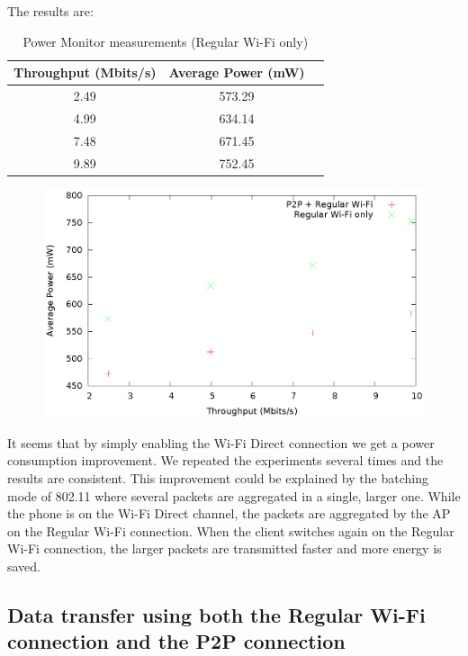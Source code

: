 The results are:

\begin{table}[h!]
  \centering
  \caption{Power Monitor measurements (Regular Wi-Fi only)}
  \label{tab:table1}
  \begin{tabular}{ccc}
    \toprule
    Throughput (Mbits/s) & Average Power (mW) \\
    \midrule
    2.49 & 573.29\\
    4.99 & 634.14\\
    7.48 & 671.45\\
    9.89 & 752.45\\
    \bottomrule
  \end{tabular}
\end{table}

\begin{figure}
\includegraphics{src/img/powervalues.eps}
\end{figure}

It seems that by simply enabling the Wi-Fi Direct connection we get a power consumption improvement. We repeated the experiments several times and the results are consistent. This improvement could be explained by the batching mode of 802.11 where several packets are aggregated in a single, larger one. While the phone is on the Wi-Fi Direct channel, the packets are aggregated by the AP on the Regular Wi-Fi connection. When the client switches again on the Regular Wi-Fi connection, the larger packets are transmitted faster and more energy is saved.

\subsection{Data transfer using both the Regular Wi-Fi connection and the P2P connection}
\label{sub-sec:transfer-parallel2}

